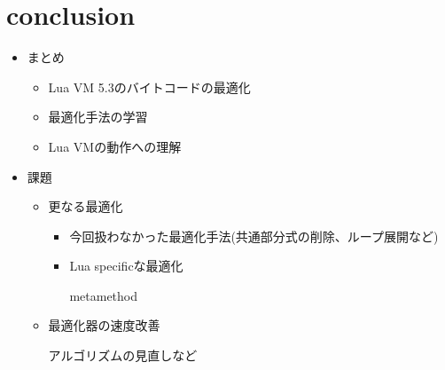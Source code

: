 \section{conclusion}
\begin{frame}
\frametitlesec
\begin{itemize}
	\item まとめ
		\begin{itemize}
			\item Lua VM 5.3のバイトコードの最適化
			\item 最適化手法の学習
			\item Lua VMの動作への理解
		\end{itemize}
	\item<2-> 課題
		\begin{itemize}
			\item 更なる最適化

				\begin{itemize}
					\item 今回扱わなかった最適化手法(共通部分式の削除、ループ展開など)
					\item Lua specificな最適化

						metamethod
				\end{itemize}
			\item 最適化器の速度改善

				アルゴリズムの見直しなど
		\end{itemize}
\end{itemize}
\end{frame}
